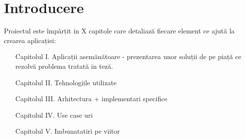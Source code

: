 \chapter*{Introducere} 
Proiectul este împărțit in X capitole care detaliază fiecare element ce ajută la crearea aplicației:

\begin{itemize}
	\item[Capitolul I.] Aplicații asemănătoare - prezentarea unor soluții de pe piață ce rezolvă problema tratată in teză.
	\item[Capitolul II.] Tehnologiile utilizate
	\item[Capitolul III.] Arhitectura + implementari specifice
	\item[Capitolul IV.] Use case uri
	\item[Capitolul V.] Imbunatatiri pe viitor
\end{itemize}